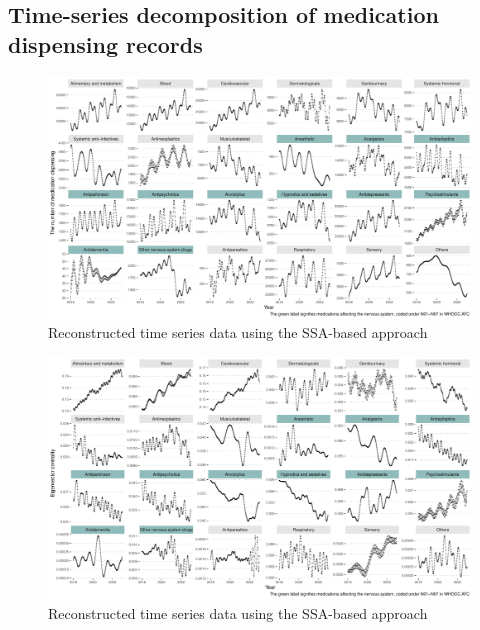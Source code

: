 \documentclass[
  letterpaper,
  DIV=11,
  numbers=noendperiod]{scrartcl}
\begin{document}
\subsection{Time-series decomposition of medication dispensing
records}\label{time-series-decomposition-of-medication-dispensing-records}

\begin{figure}[H]

{\centering \includegraphics[width=1\linewidth,height=\textheight,keepaspectratio]{supplementary_files/figure-pdf/unnamed-chunk-2-1.pdf}

}

\caption{Reconstructed time series data using the SSA-based approach}

\end{figure}%

\begin{figure}[H]

{\centering \includegraphics[width=1\linewidth,height=\textheight,keepaspectratio]{supplementary_files/figure-pdf/unnamed-chunk-2-2.pdf}

}

\caption{Reconstructed time series data using the SSA-based approach}

\end{figure}%
\end{document}
